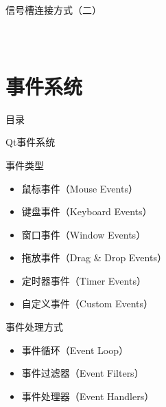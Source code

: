 \documentclass[UTF8,aspectratio=169]{beamer}
\begin{document}
\begin{frame}[fragile]{信号槽连接方式（二）}
    \begin{columns}
        \begin{column}{0.48\textwidth}
            \inputminted[firstline=26,lastline=38]{cpp}{code/qt_connect_advanced_example.cpp}
        \end{column}
        \begin{column}{0.48\textwidth}
            \inputminted[firstline=39,lastline=56]{cpp}{code/qt_connect_advanced_example.cpp}
        \end{column}
    \end{columns}
\end{frame}

\section{事件系统}
\begin{frame}{目录}
    \begin{multicols}{2}
        \tableofcontents[currentsection]
    \end{multicols}
\end{frame}

\begin{frame}{Qt事件系统}
    \begin{ytublock}{事件类型}
        \begin{itemize}
            \item 鼠标事件（Mouse Events）
            \item 键盘事件（Keyboard Events）
            \item 窗口事件（Window Events）
            \item 拖放事件（Drag \& Drop Events）
            \item 定时器事件（Timer Events）
            \item 自定义事件（Custom Events）
        \end{itemize}
    \end{ytublock}

    \begin{ytublock}{事件处理方式}
        \begin{itemize}
            \item 事件循环（Event Loop）
            \item 事件过滤器（Event Filters）
            \item 事件处理器（Event Handlers）
        \end{itemize}
    \end{ytublock}
\end{frame}
\end{document}
